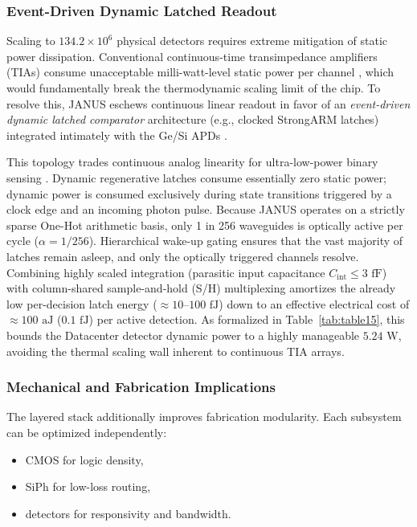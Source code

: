 \documentclass[journal]{IEEEtran}
\begin{document}
\subsubsection{\textbf{Event-Driven Dynamic Latched Readout}}

Scaling to $134.2 \times 10^{6}$ physical detectors requires extreme mitigation of static power dissipation. Conventional continuous-time transimpedance amplifiers (TIAs) consume unacceptable milli-watt-level static power per channel \cite{Achtenberg2025}, which would fundamentally break the thermodynamic scaling limit of the chip. To resolve this, JANUS eschews continuous linear readout in favor of an \textit{event-driven dynamic latched comparator} architecture (e.g., clocked StrongARM latches) integrated intimately with the Ge/Si APDs \cite{Modak2025,Claveau2024}. 

This topology trades continuous analog linearity for ultra-low-power binary sensing \cite{Zheng2025,Severini2023}. Dynamic regenerative latches consume essentially zero static power; dynamic power is consumed exclusively during state transitions triggered by a clock edge and an incoming photon pulse. Because JANUS operates on a strictly sparse One-Hot arithmetic basis, only 1 in 256 waveguides is optically active per cycle ($\alpha = 1/256$). Hierarchical wake-up gating ensures that the vast majority of latches remain asleep, and only the optically triggered channels resolve. Combining highly scaled integration (parasitic input capacitance $C_{\text{int}} \le 3\text{ fF}$) \cite{Laube2024} with column-shared sample-and-hold (S/H) multiplexing \cite{Mulberry2018} amortizes the already low per-decision latch energy ($\approx 10\text{--}100\text{ fJ}$) down to an effective electrical cost of $\approx 100\text{ aJ}$ ($0.1\text{ fJ}$) per active detection. As formalized in Table~\ref{tab:table15}, this bounds the Datacenter detector dynamic power to a highly manageable $5.24\text{ W}$, avoiding the thermal scaling wall inherent to continuous TIA arrays.

\subsubsection{\textbf{Mechanical and Fabrication Implications}}

The layered stack additionally improves fabrication modularity. Each subsystem can be optimized independently:
\begin{itemize}
\item  CMOS for logic density,
\item  SiPh for low-loss routing,
\item  detectors for responsivity and bandwidth.
\end{itemize}
\end{document}
